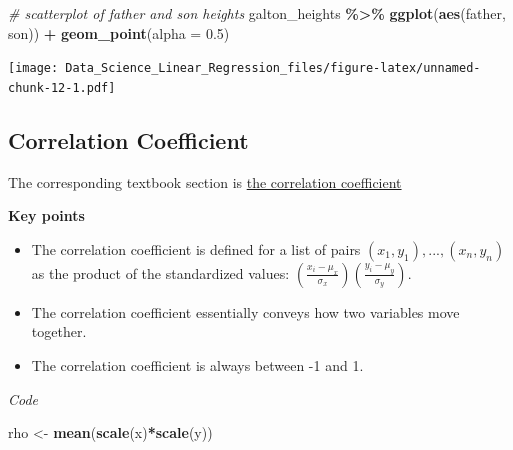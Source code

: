 \documentclass[
]{article}
\newenvironment{Shaded}{\begin{snugshade}}{\end{snugshade}}
\newcommand{\CommentTok}[1]{\textcolor[rgb]{0.56,0.35,0.01}{\textit{#1}}}
\newcommand{\DataTypeTok}[1]{\textcolor[rgb]{0.13,0.29,0.53}{#1}}
\newcommand{\FloatTok}[1]{\textcolor[rgb]{0.00,0.00,0.81}{#1}}
\newcommand{\KeywordTok}[1]{\textcolor[rgb]{0.13,0.29,0.53}{\textbf{#1}}}
\newcommand{\NormalTok}[1]{#1}
\newcommand{\OperatorTok}[1]{\textcolor[rgb]{0.81,0.36,0.00}{\textbf{#1}}}
\newcommand{\StringTok}[1]{\textcolor[rgb]{0.31,0.60,0.02}{#1}}
\providecommand{\tightlist}{%
  \setlength{\itemsep}{0pt}\setlength{\parskip}{0pt}}
\begin{document}
\begin{Shaded}
\begin{Highlighting}[]
\CommentTok{\# scatterplot of father and son heights}
\NormalTok{galton\_heights }\OperatorTok{\%\textgreater{}\%}
\StringTok{    }\KeywordTok{ggplot}\NormalTok{(}\KeywordTok{aes}\NormalTok{(father, son)) }\OperatorTok{+}
\StringTok{    }\KeywordTok{geom\_point}\NormalTok{(}\DataTypeTok{alpha =} \FloatTok{0.5}\NormalTok{)}
\end{Highlighting}
\end{Shaded}

\texttt{[image: Data\_Science\_Linear\_Regression\_files/figure-latex/unnamed-chunk-12-1.pdf]}

\hypertarget{correlation-coefficient}{%
\subsection{Correlation Coefficient}\label{correlation-coefficient}}

The corresponding textbook section is
\href{https://rafalab.github.io/dsbook/regression.html\#corr-coef}{the
correlation coefficient}

\textbf{Key points}

\begin{itemize}
\tightlist
\item
  The correlation coefficient is defined for a list of pairs
  \((x_1, y_1), ..., (x_n, y_n)\) as the product of the standardized
  values:
  \((\frac{x_i - \mu_x}{\sigma_x})(\frac{y_i -\mu_y}{\sigma_y})\).
\item
  The correlation coefficient essentially conveys how two variables move
  together.
\item
  The correlation coefficient is always between -1 and 1.
\end{itemize}

\emph{Code}

\begin{Shaded}
\begin{Highlighting}[]
\NormalTok{rho \textless{}{-}}\StringTok{ }\KeywordTok{mean}\NormalTok{(}\KeywordTok{scale}\NormalTok{(x)}\OperatorTok{*}\KeywordTok{scale}\NormalTok{(y))}
\end{Highlighting}
\end{Shaded}
\end{document}
